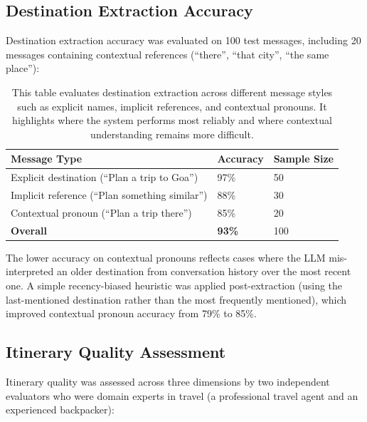 \documentclass[12pt,a4paper]{report}
\newcommand{\tableexpl}[1]{\caption*{\small #1}}
\begin{document}
\subsection{Destination Extraction Accuracy}

Destination extraction accuracy was evaluated on 100 test messages, including 20 messages containing contextual references (``there'', ``that city'', ``the same place''):

\begin{table}[H]
\centering
\caption{Destination Extraction Accuracy Results}
\tableexpl{This table evaluates destination extraction across different message styles such as explicit names, implicit references, and contextual pronouns. It highlights where the system performs most reliably and where contextual understanding remains more difficult.}
\label{tab:dest_extraction}
\begin{tabular}{lll}
\toprule
\textbf{Message Type} & \textbf{Accuracy} & \textbf{Sample Size} \\
\midrule
Explicit destination (``Plan a trip to Goa'')     & 97\% & 50 \\
Implicit reference (``Plan something similar'')   & 88\% & 30 \\
Contextual pronoun (``Plan a trip there'')         & 85\% & 20 \\
\textbf{Overall}                                   & \textbf{93\%} & 100 \\
\bottomrule
\end{tabular}
\end{table}

The lower accuracy on contextual pronouns reflects cases where the LLM mis-interpreted an older destination from conversation history over the most recent one. A simple recency-biased heuristic was applied post-extraction (using the last-mentioned destination rather than the most frequently mentioned), which improved contextual pronoun accuracy from 79\% to 85\%.

\subsection{Itinerary Quality Assessment}

Itinerary quality was assessed across three dimensions by two independent evaluators who were domain experts in travel (a professional travel agent and an experienced backpacker):
\end{document}
